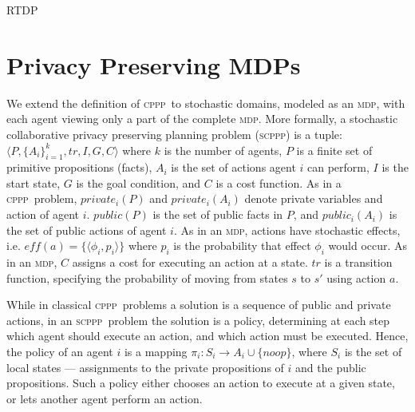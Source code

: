 \documentclass[letterpaper]{article} %
\newcommand{\cppp}{\textsc {cppp}\xspace}
\newcommand{\scppp}{\textsc {scppp}\xspace}
\newcommand{\mdp}{\textsc {mdp}\xspace}
\theoremstyle{remark}
\begin{document}
\begin{algorithm}[t!]
\footnotesize
\caption{RTDP}
    \label{alg:RTDP}
\end{algorithm}





\section{Privacy Preserving MDPs}

We extend the definition of \cppp\ to stochastic domains, modeled as an \mdp, with each agent viewing only a part of the complete \mdp.
More formally, a stochastic collaborative privacy preserving planning problem (\scppp) is a tuple: $\langle P, \{A_i\}_{i=1}^k, tr, I ,G, C \rangle$ where
$k$ is the number of agents, $P$ is a finite set of primitive propositions (facts), $A_i$ is the set of actions agent $i$ can perform,  $I$ is the start state, $G$ is the goal condition, and $C$ is a cost function.
As in a \cppp\  problem, $private_i(P)$ and $private_i(A_i)$ denote private variables and action of agent $i$. $public(P)$ is the set of public facts in $P$, and $public_i(A_i)$ is the set of public actions of agent $i$.
As in an \mdp, actions have stochastic effects, i.e. $\mathit{eff}(a)=\{\langle \phi_i, p_i \rangle\}$ where $p_i$ is the probability that effect $\phi_i$ would occur. As in an \mdp, $C$ assigns a cost for executing an action at a state. $tr$ is a transition function, specifying the probability of moving from states $s$ to $s'$ using action $a$.

While in classical \cppp\ problems a solution is a sequence of public and private actions, in an \scppp\ problem the solution is a policy, determining at each step which agent should execute an action, and which action must be executed. Hence, the policy of an agent $i$ is a mapping  $\pi_i: S_i \rightarrow A_i \cup \{\mathit{noop}\}$, where $S_i$ is the set of local states --- assignments to the private propositions of $i$ and the public propositions. Such a policy either chooses an action to execute at a given state, or lets another agent perform an action.
\end{document}
